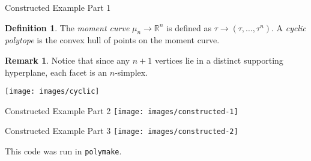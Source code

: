 \documentclass[9pt]{beamer}
\theoremstyle{definition}
\newtheorem{remark}{Remark}
\newtheorem{defn}{Definition}
\begin{document}
\begin{frame}[fragile]{Constructed Example Part 1}
  \begin{defn}
    The \emph{moment curve} $\mu_n \to \mathbb{R}^n$ is defined as
    $\tau \to (\tau, \dots, \tau^n)$. A \emph{cyclic polytope}
    is the convex hull of points on the moment curve.
  \end{defn}
    
  \begin{remark}
    Notice that since any $n + 1$ vertices lie in a distinct supporting
    hyperplane, each facet is an $n$-simplex. 
  
  \end{remark}

  \begin{center}
    \texttt{[image: images/cyclic]}
  \end{center}

\end{frame}


\begin{frame}[fragile]{Constructed Example Part 2}
  \texttt{[image: images/constructed-1]}
\end{frame}


\begin{frame}[fragile]{Constructed Example Part 3}
  \texttt{[image: images/constructed-2]}

  This code was run in \texttt{polymake}.
\end{frame}





\end{document}
